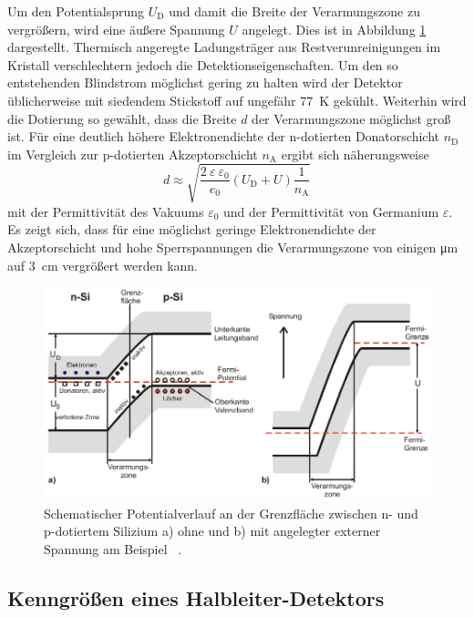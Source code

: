 Um den Potentialsprung $U_\text{D}$ und damit die Breite der Verarmungszone zu vergrößern,
wird eine äußere Spannung $U$ angelegt.
Dies ist in Abbildung \ref{fig:SchematischerPotentialverlauf} dargestellt.
Thermisch angeregte Ladungsträger aus Restverunreinigungen im Kristall verschlechtern
jedoch die Detektionseigenschaften.
Um den so entstehenden Blindstrom möglichst gering zu halten wird der
Detektor üblicherweise mit siedendem Stickstoff auf ungefähr \SI{77}{\kelvin} gekühlt.
Weiterhin wird die Dotierung so gewählt, dass die Breite $d$ der Verarmungszone möglichst groß ist.
Für eine deutlich höhere Elektronendichte der n-dotierten Donatorschicht $n_\text{D}$ im
Vergleich zur p-dotierten Akzeptorschicht $n_\text{A}$ ergibt sich näherungsweise
\begin{equation}
	d \approx \sqrt{\frac{2\:\varepsilon\:\varepsilon_0}{e_0} \left(U_\text{D} + U\right) \frac{1}{n_\text{A}}}
	\label{eqn:BreiteVerarmungszone}
\end{equation}
mit der Permittivität des Vakuums $\varepsilon_0$ und der Permittivität von Germanium $\varepsilon$.
Es zeigt sich, dass für eine möglichst geringe Elektronendichte der Akzeptorschicht und hohe
Sperrspannungen die Verarmungszone von einigen \si{\micro\meter} auf \SI{3}{\centi\meter} vergrößert werden kann.
\begin{figure}
	\centering
	\includegraphics[width=\textwidth]{images/Schematischer-Potentialverlauf.pdf}
	\caption{Schematischer Potentialverlauf an der Grenzfläche zwischen n- und p-dotiertem
	Silizium a) ohne und b) mit angelegter externer Spannung am Beispiel ~\cite[12]{anleitung}.}
	\label{fig:SchematischerPotentialverlauf}
\end{figure}

\subsection{Kenngrößen eines Halbleiter-Detektors}
\label{sec:KenngroessenHLDetektor}

